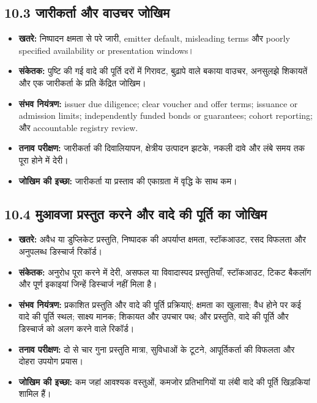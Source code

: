 \documentclass[11pt]{article}
\begin{document}
\subsection*{10.3 जारीकर्ता और वाउचर जोखिम}

\begin{itemize}[leftmargin=*]
\item \textbf{खतरे:} निष्पादन क्षमता से परे जारी, emitter default, misleading terms और poorly specified availability or presentation windows।
\item \textbf{संकेतक:} पुष्टि की गई वादे की पूर्ति दरों में गिरावट, बुढ़ापे वाले बकाया वाउचर, अनसुलझे शिकायतें और एक जारीकर्ता के प्रति केंद्रित जोखिम।
\item \textbf{संभव नियंत्रण:} issuer due diligence; clear voucher and offer terms; issuance or admission limits; independently funded bonds or guarantees; cohort reporting; और accountable registry review.
\item \textbf{तनाव परीक्षण:} जारीकर्ता की दिवालियापन, क्षेत्रीय उत्पादन झटके, नकली दावे और लंबे समय तक पूरा होने में देरी।
\item \textbf{जोखिम की इच्छा:} जारीकर्ता या प्रस्ताव की एकाग्रता में वृद्धि के साथ कम।
\end{itemize}
\subsection*{10.4 मुआवजा प्रस्तुत करने और वादे की पूर्ति का जोखिम}

\begin{itemize}[leftmargin=*]
\item \textbf{खतरे:} अवैध या डुप्लिकेट प्रस्तुति, निष्पादक की अपर्याप्त क्षमता, स्टॉकआउट, रसद विफलता और अनुपलब्ध डिस्चार्ज रिकॉर्ड।
\item \textbf{संकेतक:} अनुरोध पूरा करने में देरी, असफल या विवादास्पद प्रस्तुतियाँ, स्टॉकआउट, टिकट बैकलॉग और पूर्ण इकाइयां जिन्हें डिस्चार्ज नहीं मिला है।
\item \textbf{संभव नियंत्रण:} प्रकाशित प्रस्तुति और वादे की पूर्ति प्रक्रियाएं; क्षमता का खुलासा; वैध होने पर कई वादे की पूर्ति स्थल; साक्ष्य मानक; शिकायत और उपचार पथ; और प्रस्तुति, वादे की पूर्ति और डिस्चार्ज को अलग करने वाले रिकॉर्ड।
\item \textbf{तनाव परीक्षण:} दो से चार गुना प्रस्तुति मात्रा, सुविधाओं के टूटने, आपूर्तिकर्ता की विफलता और दोहरा उपयोग प्रयास।
\item \textbf{जोखिम की इच्छा:} कम जहां आवश्यक वस्तुओं, कमजोर प्रतिभागियों या लंबी वादे की पूर्ति खिड़कियां शामिल हैं।
\end{itemize}
\end{document}
